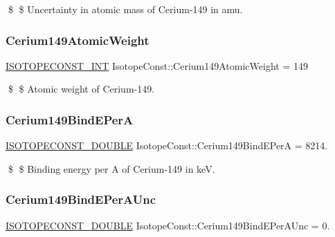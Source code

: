 \$ \$ Uncertainty in atomic mass of Cerium-\/149 in amu. \mbox{\label{group___isotope_const-_cerium-_ce149_gad2223aafb8740b77c226259ccfae88a7}} 
\subsubsection{\texorpdfstring{Cerium149\+Atomic\+Weight}{Cerium149AtomicWeight}}
{\footnotesize\ttfamily \mbox{\hyperlink{group___isotope_const-_macros_ga5f18360b3e99483a35c32d789e62621c}{I\+S\+O\+T\+O\+P\+E\+C\+O\+N\+S\+T\+\_\+\+I\+NT}} Isotope\+Const\+::\+Cerium149\+Atomic\+Weight = 149}

\$ \$ Atomic weight of Cerium-\/149. \mbox{\label{group___isotope_const-_cerium-_ce149_ga9053020ee7ebf07dea16244588cb861d}} 
\subsubsection{\texorpdfstring{Cerium149\+Bind\+E\+PerA}{Cerium149BindEPerA}}
{\footnotesize\ttfamily \mbox{\hyperlink{group___isotope_const-_macros_ga8f45a7272ce02c0b4c65c44636ed719a}{I\+S\+O\+T\+O\+P\+E\+C\+O\+N\+S\+T\+\_\+\+D\+O\+U\+B\+LE}} Isotope\+Const\+::\+Cerium149\+Bind\+E\+PerA = 8214.}

\$ \$ Binding energy per A of Cerium-\/149 in keV. \mbox{\label{group___isotope_const-_cerium-_ce149_ga33a564a1861c7b24b4edeb04dcafa4fe}} 
\subsubsection{\texorpdfstring{Cerium149\+Bind\+E\+Per\+A\+Unc}{Cerium149BindEPerAUnc}}
{\footnotesize\ttfamily \mbox{\hyperlink{group___isotope_const-_macros_ga8f45a7272ce02c0b4c65c44636ed719a}{I\+S\+O\+T\+O\+P\+E\+C\+O\+N\+S\+T\+\_\+\+D\+O\+U\+B\+LE}} Isotope\+Const\+::\+Cerium149\+Bind\+E\+Per\+A\+Unc = 0.}

